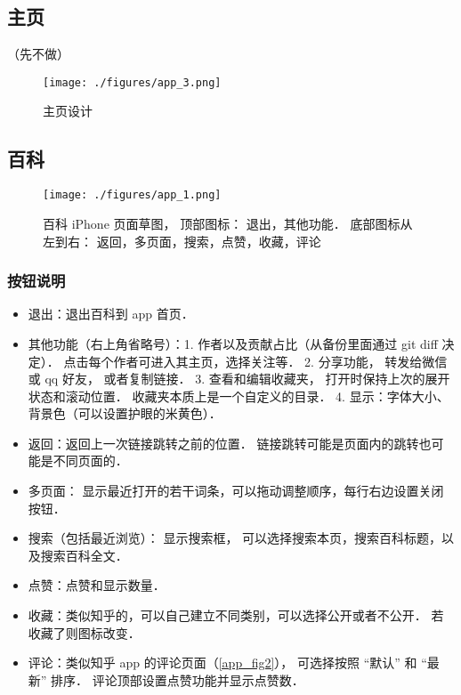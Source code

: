 
\begin{issues}
\issueDraft
\end{issues}

\subsection{主页}

（先不做）
\begin{figure}[ht]
\centering
\texttt{[image: ./figures/app\_3.png]}
\caption{主页设计} \label{app_fig3}
\end{figure}

\subsection{百科}
\begin{figure}[ht]
\centering
\texttt{[image: ./figures/app\_1.png]}
\caption{百科 iPhone 页面草图， 顶部图标： 退出，其他功能． 底部图标从左到右： 返回，多页面，搜索，点赞，收藏，评论}\label{app_fig1}
\end{figure}

\subsubsection{按钮说明}
\begin{itemize}
\item 退出：退出百科到 app 首页．
\item 其他功能（右上角省略号）：1. 作者以及贡献占比（从备份里面通过 git diff 决定）． 点击每个作者可进入其主页，选择关注等． 2. 分享功能， 转发给微信或 qq 好友， 或者复制链接． 3. 查看和编辑收藏夹， 打开时保持上次的展开状态和滚动位置． 收藏夹本质上是一个自定义的目录． 4. 显示：字体大小、 背景色（可以设置护眼的米黄色）．
\item 返回：返回上一次链接跳转之前的位置． 链接跳转可能是页面内的跳转也可能是不同页面的．
\item 多页面： 显示最近打开的若干词条，可以拖动调整顺序，每行右边设置关闭按钮．
\item 搜索（包括最近浏览）： 显示搜索框， 可以选择搜索本页，搜索百科标题，以及搜索百科全文．
\item 点赞：点赞和显示数量．
\item 收藏：类似知乎的，可以自己建立不同类别，可以选择公开或者不公开． 若收藏了则图标改变．
\item 评论：类似知乎 app 的评论页面（\autoref{app_fig2}）， 可选择按照 “默认” 和 “最新” 排序． 评论顶部设置点赞功能并显示点赞数．
\end{itemize}

